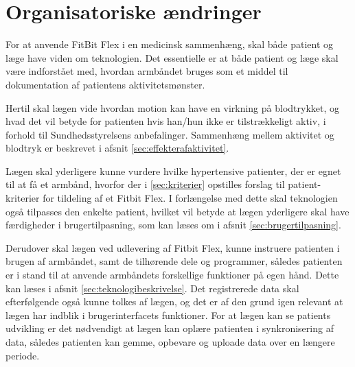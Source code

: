 \section{Organisatoriske ændringer}\label{sec:org_aendringer}

For at anvende FitBit Flex i en medicinsk sammenhæng, skal både patient og læge have viden om teknologien. Det essentielle er at både patient og læge skal være indforstået med, hvordan armbåndet bruges som et middel til dokumentation af patientens aktivitetsmønster.

Hertil skal lægen vide hvordan motion kan have en virkning på blodtrykket, og hvad det vil betyde for patienten hvis han/hun ikke er tilstrækkeligt aktiv, i forhold til Sundhedsstyrelsens anbefalinger. Sammenhæng mellem aktivitet og blodtryk er beskrevet i afsnit \ref{sec:effekterafaktivitet}.

Lægen skal yderligere kunne vurdere hvilke hypertensive patienter, der er egnet til at få et armbånd, hvorfor der i \autoref{sec:kriterier} opstilles forslag til patient-kriterier for tildeling af et Fitbit Flex. I forlængelse med dette skal teknologien også tilpasses den enkelte patient, hvilket vil betyde at lægen yderligere skal have færdigheder i brugertilpasning, som kan læses om i afsnit \ref{sec:brugertilpasning}. 

Derudover skal lægen ved udlevering af Fitbit Flex, kunne instruere patienten i brugen af armbåndet, samt de tilhørende dele og programmer, således patienten er i stand til at anvende armbåndets forskellige funktioner på egen hånd. Dette kan læses i afsnit \ref{sec:teknologibeskrivelse}. Det registrerede data skal efterfølgende også kunne tolkes af lægen, og det er af den grund igen relevant at lægen har indblik i brugerinterfacets funktioner. For at lægen kan se patients udvikling er det nødvendigt at lægen kan oplære patienten i synkronisering af data, således patienten kan gemme, opbevare og uploade data over en længere periode.